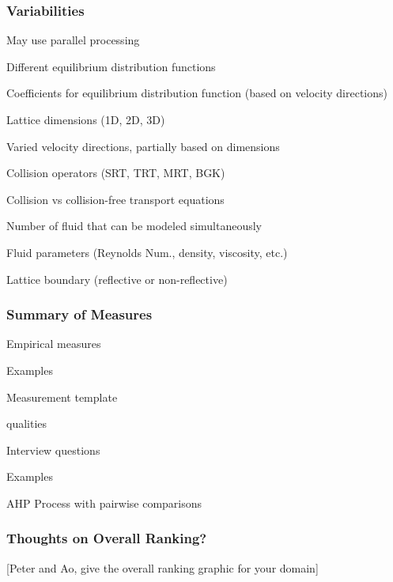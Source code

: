 \documentclass[t,12pt,numbers,fleqn]{beamer}
\begin{document}
\begin{frame}
\frametitle{Variabilities}

\bi
\item May use parallel processing
\item Different equilibrium distribution functions
\item Coefficients for equilibrium distribution function (based on velocity directions)
\item Lattice dimensions (1D, 2D, 3D)
\item Varied velocity directions, partially based on dimensions 
\item Collision operators (SRT, TRT, MRT, BGK)
\item Collision vs collision-free transport equations
\item Number of fluid that can be modeled simultaneously
\item Fluid parameters (Reynolds Num., density, viscosity, etc.)
\item Lattice boundary (reflective or non-reflective)
\ei

\end{frame}


\begin{frame}
\frametitle{Summary of Measures}

\bi
\item Empirical measures
  \bi
  \item Examples
  \ei
\item Measurement template
  \bi
  \item qualities
  \ei
\item Interview questions
  \bi
  \item Examples
  \ei
  \item AHP Process with pairwise comparisons
\ei
\end{frame}


\begin{frame}
\frametitle{Thoughts on Overall Ranking?}

[Peter and Ao, give the overall ranking graphic for your domain]

\end{frame}

\end{document}
